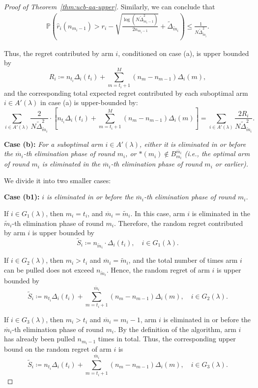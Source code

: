 \documentclass[11pt]{article}
\begin{document}
\begin{proof}[Proof of Theorem~\ref{thm:ucb-aa-upper}]
Similarly, we can conclude that
\begin{align}
    \mathbb{P}\left( \hat{r}_i(n_{m_i-1})>r_i - \sqrt{\frac{\log(N \tilde{\Delta}_{m_i-1}^2)}{2n_{m_i-1}}}+\tilde{\Delta}_{\tilde{m}_i} \right) 
   \leq \frac{1}{N\tilde{\Delta}_{\tilde{m}_i}^2}.
    \label{eq: optimal is bad A-3 G-3}
\end{align}

Thus, the regret contributed by arm $i$, conditioned on case (a), is upper bounded by
\[
R_i \coloneqq n_{t_i}\Delta_i(t_i) + \sum_{m = t_i + 1}^{M} (n_m - n_{m-1})\Delta_i(m),
\]
and the corresponding total expected regret contributed by each suboptimal arm $i\in A'(\lambda)$ in case (a) is upper-bounded by:
\[\sum_{i\in A'(\lambda)}\frac{2}{N \tilde{\Delta}_{\tilde{m}_i}^2}\cdot\left[n_{t_i}\Delta_i(t_i) + \sum_{m = t_i + 1}^{M} (n_m - n_{m-1})\Delta_i(m)\right]=\sum_{i\in A'(\lambda)}\frac{2R_i}{N\tilde{\Delta}_{\tilde{m}_i}^2}.\]

\textbf{Case (b):} \textit{For a suboptimal arm \( i \in A'(\lambda)\), either it is eliminated in or before the $\overline{m}_i$-th elimination phase of round $m_i$, or \( *(m_i) \notin B_{m_i}^{\overline{m}_i} \) (i.e., the optimal arm of round \( m_i \) is eliminated in the $\overline{m}_i$-th elimination phase of round $m_i$ or earlier).  }

We divide it into two smaller cases:

\textbf{Case (b1):}\textit{ $i$ is eliminated in or before the $\overline{m}_i$-th elimination phase of round $m_i$.  }

If $i\in G_1(\lambda)$, then $m_i=t_i$, and $\overline{m}_i=\tilde{m}_i$. In this case, arm $i$ is eliminated in the $\tilde{m}_i$-th elimination phase of round $m_i$. Therefore, the random regret contributed by arm $i$ is upper bounded by
\[\tilde{S}_i\coloneqq n_{\tilde{m}_i}\cdot \Delta_i(t_i),\quad i\in G_1(\lambda).\]

If $i\in G_2(\lambda)$, then $m_i>t_i$ and $\overline{m}_i=\tilde{m}_i$, and the total number of times arm \( i \) can be pulled does not exceed $n_{\tilde{m}_i}$. Hence, the random regret of arm $i$ is upper bounded by
\[\tilde{S}_i\coloneqq n_{t_i}\Delta_i(t_i) + \sum_{m = t_i + 1}^{\overline{m}_i} (n_m - n_{m-1})\Delta_i(m), \quad i\in G_2(\lambda).\]

If $i\in G_3(\lambda)$, then $m_i>t_i$ and $\overline{m}_i=m_i-1$, arm $i$ is eliminated in or before the $\overline{m}_i$-th elimination phase of round $m_i$. By the definition of the algorithm, arm $i$ has already been pulled $n_{m_i-1}$ times in total. Thus, the corresponding upper bound on the random regret of arm $i$ is
\[\tilde{S}_i\coloneqq n_{t_i}\Delta_i(t_i)+\sum_{m=t_i+1}^{\overline{m}_i}(n_m-n_{m-1})\Delta_i(m),\quad i\in G_3(\lambda).\]


\end{proof}
\end{document}
